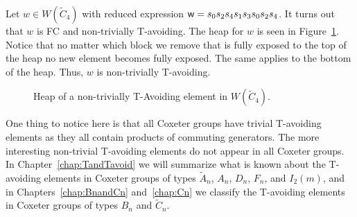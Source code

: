 %

\begin{example}
Let $w \in W(\widetilde{C}_4)$ with reduced expression $\mathsf{w}=s_0s_2s_4s_1s_3s_0s_2s_4$. It turns out that $w$ is FC and non-trivially T-avoiding. The heap for $w$ is seen in Figure~\ref{fig:sandwich1}. Notice that no matter which block we remove that is fully exposed to the top of the heap no new element becomes fully exposed. The same applies to the bottom of the heap. Thus, $w$ is non-trivially T-avoiding. 
\begin{figure}[h!]
\centering
{}
\caption{Heap of a non-trivially T-Avoiding element in $W(\widetilde{C}_4)$.}\label{fig:sandwich1}	
\end{figure}
\end{example}


One thing to notice here is that all Coxeter groups have trivial T-avoiding elements as they all contain products of commuting generators. The more interesting non-trivial T-avoiding elements do not appear in all Coxeter groups. In Chapter~\ref{chap:TandTavoid} we will summarize what is known about the T-avoiding elements in Coxeter groups of types $\widetilde{A}_n$, $A_n$, $D_n$, $F_n$, and $I_2(m)$, and in Chapters~\ref{chap:BnandCn} and~\ref{chap:Cn} we classify the T-avoiding elements in Coxeter groups of types $B_n$ and $\widetilde{C}_n$. 


